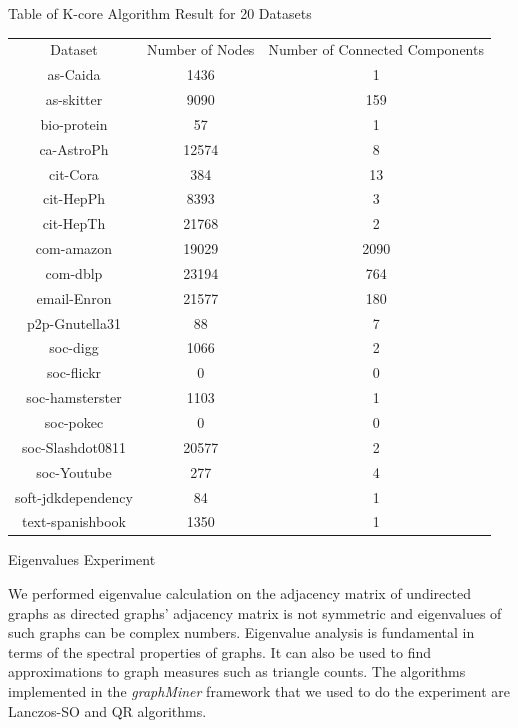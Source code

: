 \begin{center}
Table of K-core Algorithm Result for 20 Datasets
\begin{tabular}{ |c|c|c| }
 \hline
 Dataset & Number of Nodes & Number of Connected Components \\
  as-Caida & 1436 & 1 \\
  as-skitter & 9090 & 159 \\
  bio-protein & 57 & 1 \\
  ca-AstroPh & 12574 & 8 \\
  cit-Cora & 384 & 13 \\
  cit-HepPh & 8393 & 3 \\
  cit-HepTh & 21768 & 2 \\
  com-amazon & 19029 & 2090 \\
  com-dblp & 23194 & 764 \\
  email-Enron & 21577 & 180 \\
  p2p-Gnutella31 & 88 & 7 \\
  soc-digg & 1066 & 2 \\
  soc-flickr & 0 & 0 \\
  soc-hamsterster & 1103 & 1 \\
  soc-pokec & 0 & 0 \\
  soc-Slashdot0811 & 20577 & 2 \\
  soc-Youtube & 277 & 4 \\
  soft-jdkdependency & 84 & 1 \\
  text-spanishbook & 1350 & 1 \\
 \hline
\end{tabular}
\end{center}


Eigenvalues Experiment

We performed eigenvalue calculation on the adjacency matrix of undirected graphs as directed graphs' adjacency matrix is not symmetric and eigenvalues of such graphs can be complex numbers. Eigenvalue analysis is fundamental in terms of the spectral properties of graphs. It can also be used to find approximations to graph measures such as triangle counts.  The algorithms implemented in the {\em graphMiner} framework that we used to do the experiment are Lanczos-SO and QR algorithms.




